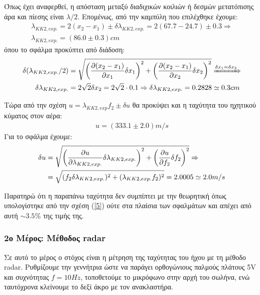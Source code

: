 \documentclass[a4paper]{article}
\begin{document}

Όπως έχει αναφερθεί, η απόσταση μεταξύ διαδιχικών κοιλιών ή δεσμών μετατόπισης άρα και πίεσης είναι $\lambda /2$. Επομένως, από την καμπύλη που επιλέχθηκε έχουμε: 
\begin{align*}
\lambda_{KK2,exp.} = 2(x_2-x_1)\pm\delta\lambda_{KK2,exp.} = 2(67.7-24.7)\pm0.3 \Rightarrow \\ 
\boxed{\lambda_{KK2,exp.} = (86.0\pm0.3)cm}
\end{align*}
όπου το σφάλμα προκύπτει από διάδοση: 
\begin{align*}
\delta (\lambda_{KK2,exp.}/2) &= \sqrt{\left( \pdv{(x_2-x_1)}{x_1}\delta x_1 \right)^2 + \left( \pdv{(x_2-x_1)}{x_2}\delta x_2 \right)^2  } \xRightarrow{\delta x_1 = \delta x_2} \\ 
\delta\lambda_{KK2,exp.} &= 2\sqrt{2}\delta x_2 =2\sqrt{2}\cdot 0.1\Rightarrow \delta\lambda_{KK2,exp.} = 0.2828 \simeq 0.3 cm
\end{align*}

 Τώρα από την σχέση $u=\lambda_{KK2,exp}f_2\pm\delta u$ θα προκύψει και η ταχύτητα του ηχητικού κύματος στον αέρα: 
 \begin{align*}
 \boxed{u = (333.1\pm 2.0) m /s }
 \end{align*}
 Για το σφάλμα έχουμε: 
 \begin{align*}
 	\delta u &= \sqrt{\left( \pdv{u}{\lambda_{KK2,exp.}}\delta\lambda_{KK2,exp.} \right)^2 + \left( \pdv{u}{f_2}\delta f_{2} \right)^2 }\Rightarrow \\ 
 	&= \sqrt{(f_2\delta\lambda_{KK2,exp.})^2 + (\lambda_{KK2,exp.}f_2)^2} = 2.0005\simeq 2.0 m/s
 \end{align*}
 
 Παρατηρώ ότι η παραπάνω ταχύτητα δεν συμπίπτει με την θεωρητική όπως υπολογίστηκε από την σχέση (\ref{5}) ούτε στα πλαίσια των σφαλμάτων και απέχει από αυτή $\sim 3.5\%$ της τιμής της. 
 
 \subsubsection*{2ο Μέρος: Μέθοδος radar}
 Σε αυτό το μέρος ο στόχος είναι η μέτρηση της ταχύτητας του ήχου με τη μέθοδο radar. Ρυθμίζουμε την γεννήτρια ώστε να παράγει ορθογώνιους παλμούς πλάτους 5V και συχνότητας $f=10Hz$, τοποθετούμε το μικρόφωνο στην αρχή του σωλήνα, ενώ ταυτόχρονα κλείνουμε το δεξί άκρο με τον ανακλαστήρα.
 
\end{document}

